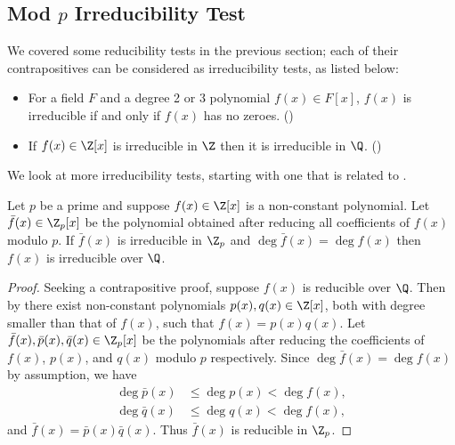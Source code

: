 \subsection{Mod $p$ Irreducibility Test}
We covered some reducibility tests in the previous section; each of their contrapositives can be considered as irreducibility tests, as listed below:
\begin{itemize}
    \item For a field $F$ and a degree 2 or 3 polynomial $f(x) \in F[x]$, $f(x)$ is irreducible if and only if $f(x)$ has no zeroes. ()
    \item If $f(x) \in \Z[x]$ is irreducible in $\Z$ then it is irreducible in $\Q$. ()
\end{itemize}
We look at more irreducibility tests, starting with one that is related to .

\begin{theorem}\label{thrm-mod-p-irreducibility-test}
    Let $p$ be a prime and suppose $f(x) \in \Z[x]$ is a non-constant polynomial. Let $\bar{f}(x) \in \Z_p[x]$ be the polynomial obtained after reducing all coefficients of $f(x)$ modulo $p$. If $\bar{f}(x)$ is irreducible in $\Z_p$ and $\deg \bar{f}(x) = \deg f(x)$ then $f(x)$ is irreducible over $\Q$.
\end{theorem}
\begin{proof}
    Seeking a contrapositive proof, suppose $f(x)$ is reducible over $\Q$. Then by  there exist non-constant polynomials $p(x), q(x) \in \Z[x]$, both with degree smaller than that of $f(x)$, such that $f(x) = p(x)q(x)$. Let $\bar{f}(x), \bar{p}(x), \bar{q}(x) \in \Z_p[x]$ be the polynomials after reducing the coefficients of $f(x)$, $p(x)$, and $q(x)$ modulo $p$ respectively. Since $\deg \bar{f}(x) = \deg f(x)$ by assumption, we have
    \begin{align*}
        \deg \bar{p}(x) &\leq \deg p(x) < \deg f(x),\\
        \deg \bar{q}(x) &\leq \deg q(x) < \deg f(x),
    \end{align*}
    and $\bar{f}(x) = \bar{p}(x)\bar{q}(x)$. Thus $\bar{f}(x)$ is reducible in $\Z_p$.
\end{proof}


